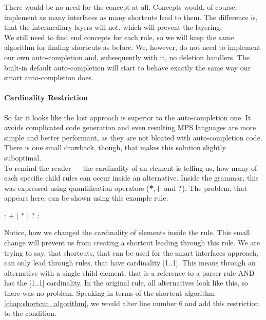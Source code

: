 There would be no need for the  concept at all.
Concepts would, of course, implement as many interfaces as many shortcuts lead to them.
The difference is, that the intermediary layers will not, which will prevent the layering.
\\

We still need to find end concepts for each rule, so we will keep the same algorithm for finding shortcuts as before.
We, however, do not need to implement our own auto-completion and, subsequently with it, no deletion handlers.
The built-in default auto-completion will start to behave exactly the same way our smart auto-completion does.

\paragraph{Cardinality Restriction}
\label{chap:cardinality_restriction}

So far it looks like the last approach is superior to the auto-completion one.
It avoids complicated code generation and even resulting MPS languages are more simple and better performant, as they are not bloated with auto-completion code.
There is one small drawback, though, that makes this solution slightly suboptimal.
\\

To remind the reader --- the cardinality of an element is telling us, how many of each specific child rules can occur inside an alternative.
Inside the grammar, this was expressed using quantification operators (\textbf{*},\textbf{+} and \textbf{?}).
The problem, that appears here, can be shown using this example rule:

\begin{antlr}
      :   +
             |   *
             |   ?
             ;
\end{antlr}

Notice, how we changed the cardinality of elements inside the  rule.
This small change will prevent us from creating a shortcut leading through this rule.
We are trying to say, that shortcuts, that can be used for the smart interfaces approach, can only lead through rules, that have cardinality [1..1].
This means through an alternative with a single child element, that is a reference to a parser rule AND has the [1..1] cardinality.
In the original  rule, all alternatives look like this, so there was no problem.
Speaking in terms of the shortcut algorithm \ref{chap:shortcut_algorithm}, we would alter line number 6 and add this restriction to the condition.
\\


